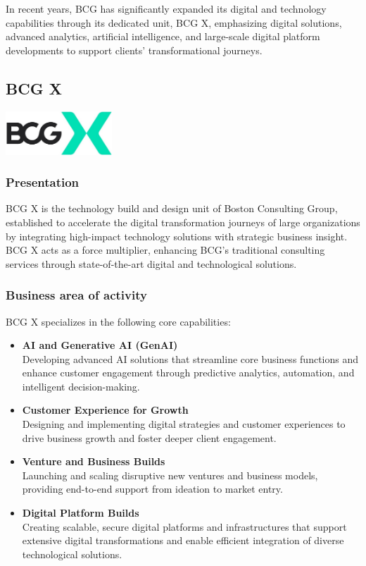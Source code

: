 In recent years, BCG has significantly expanded its digital and technology capabilities through its dedicated unit, BCG X, emphasizing digital solutions, advanced analytics, artificial intelligence, and large-scale digital platform developments to support clients' transformational journeys.

\subsection{BCG X}
\begin{center}
    \centering
    \includegraphics[width=0.3\textwidth]{Images/BCG_X.jpg}
     \cite{bcg_x_logo}
    \label{fig:bcg_x_logo}
\end{center}

\subsubsection{Presentation}
BCG X is the technology build and design unit of Boston Consulting Group, established to accelerate the digital transformation journeys of large organizations by integrating high-impact technology solutions with strategic business insight. BCG X acts as a force multiplier, enhancing BCG’s traditional consulting services through state-of-the-art digital and technological solutions.

\subsubsection{Business area of activity}
BCG X specializes in the following core capabilities:
\begin{itemize}
    \item \textbf{AI and Generative AI (GenAI) }\\
        Developing advanced AI solutions that streamline core business functions and enhance customer engagement through predictive analytics, automation, and intelligent decision-making.
    \item \textbf{Customer Experience for Growth }\\
        Designing and implementing digital strategies and customer experiences to drive business growth and foster deeper client engagement.
    \item \textbf{Venture and Business Builds }\\
        Launching and scaling disruptive new ventures and business models, providing end-to-end support from ideation to market entry.
    \item \textbf{Digital Platform Builds }\\
        Creating scalable, secure digital platforms and infrastructures that support extensive digital transformations and enable efficient integration of diverse technological solutions.
\end{itemize}

